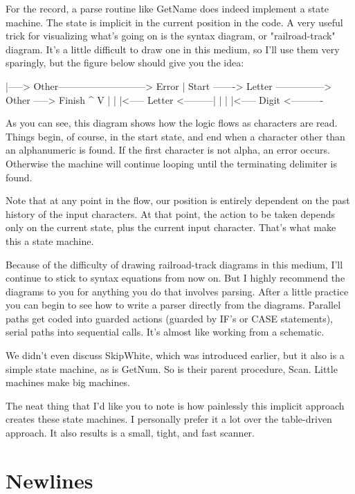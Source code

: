 \documentclass[float=false, crop=false]{standalone}
\begin{document}
For the record, a parse routine like GetName does indeed implement a state
machine. The state is implicit in the current position in the code. A very
useful trick for visualizing what's going on is the syntax diagram, or
"railroad-track" diagram. It's a little difficult to draw one in this medium, so
I'll use them very sparingly, but the figure below should give you the idea:


           |-----> Other---------------------------> Error
           |
   Start -------> Letter ---------------> Other -----> Finish
           ^                        V
           |                        |
           |<----- Letter <---------|
           |                        |
           |<----- Digit  <----------


As you can see, this diagram shows how the logic flows as characters are read.
Things begin, of course, in the start state, and end when a character other than
an alphanumeric is found. If the first character is not alpha, an error occurs.
Otherwise the machine will continue looping until the terminating delimiter is
found.

Note that at any point in the flow, our position is entirely dependent on the
past history of the input characters. At that point, the action to be taken
depends only on the current state, plus the current input character. That's what
make this a state machine.

Because of the difficulty of drawing railroad-track diagrams in this medium,
I'll continue to stick to syntax equations from now on. But I highly recommend
the diagrams to you for anything you do that involves parsing. After a little
practice you can begin to see how to write a parser directly from the diagrams.
Parallel paths get coded into guarded actions (guarded by IF's or CASE
statements), serial paths into sequential calls. It's almost like working from a
schematic.

We didn't even discuss SkipWhite, which was introduced earlier, but it also is a
simple state machine, as is GetNum. So is their parent procedure, Scan. Little
machines make big machines.

The neat thing that I'd like you to note is how painlessly this implicit
approach creates these state machines. I personally prefer it a lot over the
table-driven approach. It also results is a small, tight, and fast scanner.


\section{Newlines}
\end{document}
